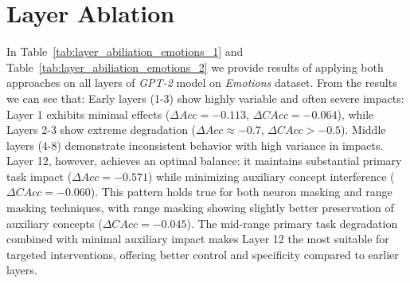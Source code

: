 \section{Layer Ablation}
\label{sec:layer_abiliation}

In Table~\ref{tab:layer_abiliation_emotions_1} and Table~\ref{tab:layer_abiliation_emotions_2} we provide results of applying both approaches on all layers of \textit{GPT-2} model on \textit{Emotions} dataset. From the results we can see that: Early layers (1-3) show highly variable and often severe impacts: Layer 1 exhibits minimal effects ($\Delta Acc = -0.113$, $\Delta CAcc = -0.064$), while Layers 2-3 show extreme degradation ($\Delta Acc \approx -0.7$, $\Delta CAcc > -0.5$). Middle layers (4-8) demonstrate inconsistent behavior with high variance in impacts. Layer 12, however, achieves an optimal balance: it maintains substantial primary task impact ($\Delta Acc = -0.571$) while minimizing auxiliary concept interference ($\Delta CAcc = -0.060$). This pattern holds true for both neuron masking and range masking techniques, with range masking showing slightly better preservation of auxiliary concepts ($\Delta CAcc = -0.045$). The mid-range primary task degradation combined with minimal auxiliary impact makes Layer 12 the most suitable for targeted interventions, offering better control and specificity compared to earlier layers.
